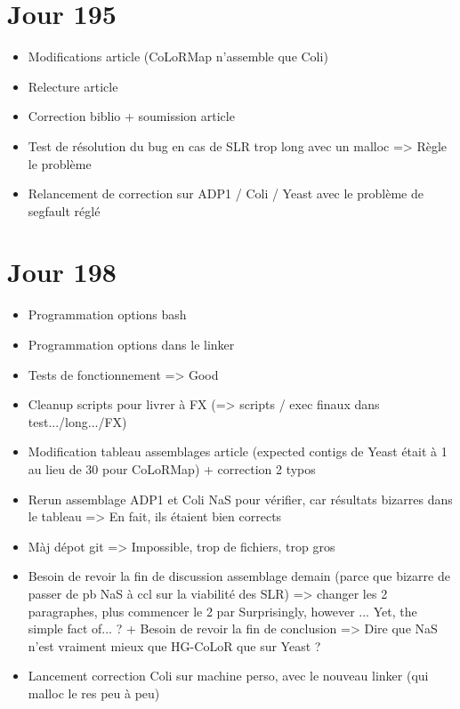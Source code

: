 \documentclass[12pt]{report}
\begin{document}
\section{Jour 195}

\begin{itemize}
	\item Modifications article (CoLoRMap n'assemble que Coli)
	
	\item Relecture article
	
	\item Correction biblio + soumission article
	
	\item Test de résolution du bug en cas de SLR trop long avec un malloc => Règle le problème
	
	\item Relancement de correction sur ADP1 / Coli / Yeast avec le problème de segfault réglé
\end{itemize}

\section{Jour 198}

\begin{itemize}
	\item Programmation options bash
	
	\item Programmation options dans le linker
	
	\item Tests de fonctionnement => Good
	
	\item Cleanup scripts pour livrer à FX (=> scripts / exec finaux dans test.../long.../FX)
	
	\item Modification tableau assemblages article (expected contigs de Yeast était à 1 au lieu de 30 pour CoLoRMap) + correction 2 typos
	
	\item Rerun assemblage ADP1 et Coli NaS pour vérifier, car résultats bizarres dans le tableau => En fait, ils étaient bien corrects
	
	\item Màj dépot git => Impossible, trop de fichiers, trop gros
	
	\item Besoin de revoir la fin de discussion assemblage demain (parce que bizarre de passer de pb NaS à ccl sur la viabilité des SLR)
		  => changer les 2 paragraphes, plus commencer le 2 par Surprisingly, however ... Yet, the simple fact of... ?
		  + Besoin de revoir la fin de conclusion => Dire que NaS n'est vraiment mieux que HG-CoLoR que sur Yeast ?
	
	\item Lancement correction Coli sur machine perso, avec le nouveau linker (qui malloc le res peu à peu)
\end{itemize}
\end{document}
